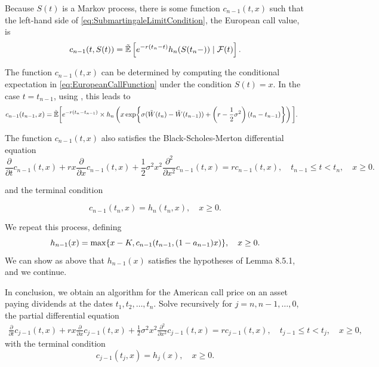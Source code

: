 Because $S(t)$ is a Markov process, there is some function $c_{n-1}(t, x)$ such that the left-hand side of \eqref{eq:SubmartingaleLimitCondition}, the European call value, is
\begin{equation}
	c_{n-1}(t, S(t)) = \tilde{\E} \left[ e^{-r(t_n-t)}h_n(S(t_n-)) \mid \cF(t) \right]. \label{eq:EuropeanCallFunction}
\end{equation}

The function $c_{n-1}(t, x)$ can be determined by computing the conditional expectation in \eqref{eq:EuropeanCallFunction} under the condition $S(t) = x$. In the case $t = t_{n-1}$, using , this leads to
\begin{align}
	c_{n-1}(t_{n-1}, x)
	 & = \tilde{\E} \bigg[ e^{-r(t_n-t_{n-1})}
		\times h_n \left( x \exp \set[\bigg]{ \sigma (\tilde{W}(t_n) - \tilde{W}(t_{n-1})) + \left( r - \frac{1}{2}\sigma^2 \right) (t_n - t_{n-1}) } \right) \bigg]. \label{eq:RecursiveExpectationFormula}
\end{align}

The function $c_{n-1}(t, x)$ also satisfies the Black-Scholes-Merton differential equation
\begin{equation}
	\frac{\partial}{\partial t}c_{n-1}(t, x) + rx \frac{\partial}{\partial x}c_{n-1}(t, x) + \frac{1}{2}\sigma^2 x^2 \frac{\partial^2}{\partial x^2}c_{n-1}(t, x) = r c_{n-1}(t, x), \quad t_{n-1} \leq t < t_n, \quad x \geq 0. \label{eq:BlackScholesMertonPDE}
\end{equation}

and the terminal condition

\begin{equation}
	c_{n-1}(t_n, x) = h_n(t_n, x), \quad x \ge 0.
	\label{eq:CNMinusOneTerminalAtTn}
\end{equation}

We repeat this process, defining
\[
	h_{n-1}(x) = \max \set{ x - K, c_{n-1}(t_{n-1}, (1 - a_{n-1})x) }, \quad x \ge 0.
\]
We can show as above that $h_{n-1}(x)$ satisfies the hypotheses of Lemma 8.5.1, and we continue.

In conclusion, we obtain an algorithm for the American call price on an asset paying dividends at the dates $t_1, t_2, \dots, t_n$. Solve recursively for $j = n, n-1, \dots, 0$, the partial differential equation
\begin{equation}
	\begin{split}
		\frac{\partial}{\partial t}c_{j-1}(t, x)
		+ rx \frac{\partial}{\partial x}c_{j-1}(t, x)
		+ \frac{1}{2}\sigma^2 x^2 \frac{\partial^2}{\partial x^2}c_{j-1}(t, x)
		= r c_{j-1}(t, x), \quad t_{j-1} \le t < t_j, \quad x \ge 0,
	\end{split}
	\label{eq:AmericanCallRecursionPDE}
\end{equation}
with the terminal condition
\begin{equation}
	c_{j-1}(t_j, x) = h_j(x), \quad x \ge 0.
	\label{eq:AmericanCallRecursionTerminal}
\end{equation}

